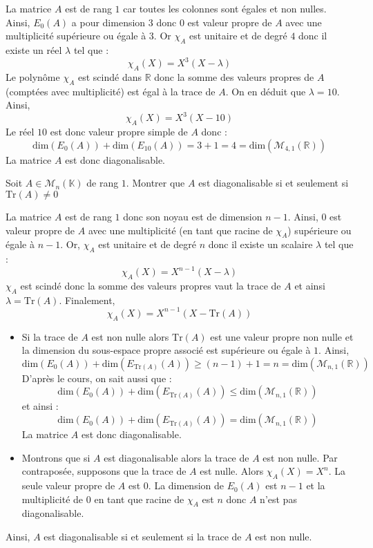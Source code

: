 \documentclass[a4paper,10pt]{report}
\begin{document}
\corr La matrice $A$ est de rang $1$ car toutes les colonnes sont égales et non nulles. Ainsi, $E_0(A)$ a pour dimension $3$ donc $0$ est valeur propre de $A$ avec une multiplicité supérieure ou égale à $3$. Or $\chi_A$ est unitaire et de degré $4$ donc il existe un réel $\lambda$ tel que :
$$ \chi_A(X) = X^3(X-\lambda)$$
Le polynôme $\chi_A$ est scindé dans $\mathbb{R}$ donc la somme des valeurs propres de $A$ (comptées avec multiplicité) est égal à la trace de $A$. On en déduit que $\lambda = 10$. Ainsi,
$$ \chi_A(X)=X^3(X- 10)$$
Le réel $10$ est donc valeur propre simple de $A$ donc :
$$ \textrm{dim}(E_0(A))+ \textrm{dim}(E_{10}(A)) = 3+1 = 4 = \textrm{dim}(\mathcal{M}_{4,1}(\mathbb{R}))$$
La matrice $A$ est donc diagonalisable.

\begin{Exercice}{}\label{Rang} Soit $A \in \mathcal{M}_{n}(\mathbb{K})$ de rang $1$. Montrer que $A$ est diagonalisable si et seulement si $\textrm{Tr}(A) \neq 0$ \end{Exercice}

\corr La matrice $A$ est de rang $1$ donc son noyau est de dimension $n-1$. Ainsi, $0$ est valeur propre de $A$ avec une multiplicité (en tant que racine de $\chi_A$) supérieure ou égale à $n-1$. Or, $\chi_A$ est unitaire et de degré $n$ donc il existe un scalaire $\lambda$ tel que :
$$ \chi_A(X)=X^{n-1}(X- \lambda)$$
$\chi_A$ est scindé donc la somme des valeurs propres vaut la trace de $A$ et ainsi $\lambda = \textrm{Tr}(A)$. Finalement,
$$ \chi_A(X)= X^{n-1}(X- \textrm{Tr}(A))$$
\begin{itemize}
\item Si la trace de $A$ est non nulle alors $\textrm{Tr}(A)$ est une valeur propre non nulle et la dimension du sous-espace propre associé est supérieure ou égale à $1$. Ainsi,
$$ \textrm{dim}(E_0(A))+ \textrm{dim}(E_{\textrm{Tr}(A)}(A)) \geq (n-1)+1 = n = \textrm{dim}(\mathcal{M}_{n,1}(\mathbb{R}))$$
D'après le cours, on sait aussi que :
$$ \textrm{dim}(E_0(A))+ \textrm{dim}(E_{\textrm{Tr}(A)}(A)) \leq \textrm{dim}(\mathcal{M}_{n,1}(\mathbb{R}))$$
et ainsi :
$$ \textrm{dim}(E_0(A))+ \textrm{dim}(E_{\textrm{Tr}(A)}(A)) = \textrm{dim}(\mathcal{M}_{n,1}(\mathbb{R}))$$
La matrice $A$ est donc diagonalisable.
\item Montrons que si $A$ est diagonalisable alors la trace de $A$ est non nulle. Par contraposée, supposons que la trace de $A$ est nulle. Alors $\chi_A(X)=X^n$. La seule valeur propre de $A$ est $0$. La dimension de $E_0(A)$ est $n-1$ et la multiplicité de $0$ en tant que racine de $\chi_A$ est $n$ donc $A$ n'est pas diagonalisable.
\end{itemize}
Ainsi, $A$ est diagonalisable si et seulement si la trace de $A$ est non nulle.
\end{document}
